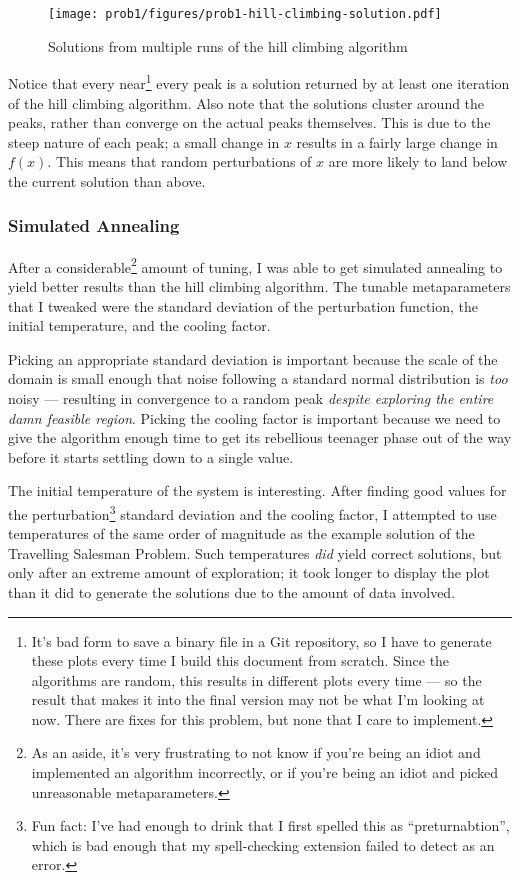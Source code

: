 \documentclass{article}
\begin{document}
\begin{figure}[h]
    \centering
    \texttt{[image: prob1/figures/prob1-hill-climbing-solution.pdf]}
    \caption{Solutions from multiple runs of the hill climbing
        algorithm}\label{fig:prob1:iterated-hill-climbing-solutions}
\end{figure}

Notice that every near\footnote{It's bad form to save a binary file in a Git repository, so I have
    to generate these plots every time I build this document from scratch. Since the algorithms are
    random, this results in different plots every time --- so the result that makes it into the
    final version may not be what I'm looking at now. There are fixes for this problem, but none
    that I care to implement.} every peak is a solution returned by at least one iteration of the
hill climbing algorithm. Also note that the solutions cluster around the peaks, rather than
converge on the actual peaks themselves. This is due to the steep nature of each peak; a small
change in $x$ results in a fairly large change in $f(x)$. This means that random perturbations of
$x$ are more likely to land below the current solution than above.

\subsubsection{Simulated Annealing}

After a considerable\footnote{As an aside, it's very frustrating to not know if you're being an
    idiot and implemented an algorithm incorrectly, or if you're being an idiot and picked
    unreasonable metaparameters.} amount of tuning, I was able to get simulated annealing to yield
better results than the hill climbing algorithm. The tunable metaparameters that I tweaked were the
standard deviation of the perturbation function, the initial temperature, and the cooling factor.

Picking an appropriate standard deviation is important because the scale of the domain is small
enough that noise following a standard normal distribution is \textit{too} noisy --- resulting in
convergence to a random peak \textit{despite exploring the entire damn feasible region}. Picking
the cooling factor is important because we need to give the algorithm enough time to get its
rebellious teenager phase out of the way before it starts settling down to a single value.

The initial temperature of the system is interesting. After finding good values for the
perturbation\footnote{Fun fact: I've had enough to drink that I first spelled this as
    ``preturnabtion'', which is bad enough that my spell-checking extension failed to detect as an
    error.} standard deviation and the cooling factor, I attempted to use temperatures of the same
order of magnitude as the example solution of the Travelling Salesman Problem. Such temperatures
\textit{did} yield correct solutions, but only after an extreme amount of exploration; it took
longer to display the plot than it did to generate the solutions due to the amount of data
involved.
\end{document}
